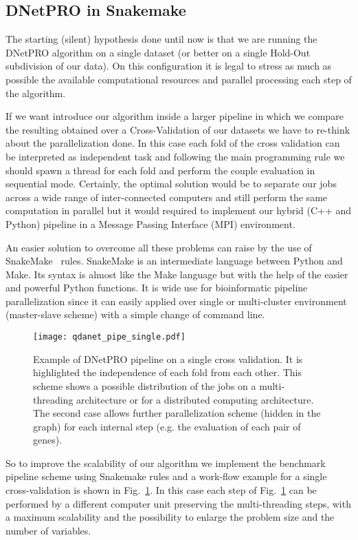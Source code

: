 \documentclass{standalone}
\begin{document}
\subsection[Pipeline]{DNetPRO in Snakemake}\label{implementation:snakemake}

The starting (silent) hypothesis done until now is that we are running the DNetPRO algorithm on a single dataset (or better on a single Hold-Out subdivision of our data).
On this configuration it is legal to stress as much as possible the available computational resources and parallel processing each step of the algorithm.

If we want introduce our algorithm inside a larger pipeline in which we compare the resulting obtained over a Cross-Validation of our datasets we have to re-think about the parallelization done.
In this case each fold of the cross validation can be interpreted as independent task and following the main programming rule \emph{} we should spawn a thread for each fold and perform the couple evaluation in sequential mode.
Certainly, the optimal solution would be to separate our jobs across a wide range of inter-connected computers and still perform the same computation in parallel but it would required to implement our hybrid (C++ and Python) pipeline in a Message Passing Interface (MPI) environment.

An easier solution to overcome all these problems can raise by the use of SnakeMake~\cite{snakemake} rules.
SnakeMake is an intermediate language between Python and Make.
Its syntax is almost like the Make language but with the help of the easier and powerful Python functions.
It is wide use for bioinformatic pipeline parallelization since it can easily applied over single or multi-cluster environment (master-slave scheme) with a simple change of command line.

\begin{center}
\begin{figure}[htbp]
\hspace{-2cm}
\texttt{[image: qdanet\_pipe\_single.pdf]}
\caption{Example of DNetPRO pipeline on a single cross validation.
It is highlighted the independence of each fold from each other.
This scheme shows a possible distribution of the jobs on a multi-threading architecture or for a distributed computing architecture.
The second case allows further parallelization scheme (hidden in the graph) for each internal step (e.g. the evaluation of each pair of genes).
}
\label{fig:dnet_workflow}
\end{figure}
\end{center}

So to improve the scalability of our algorithm we implement the benchmark pipeline scheme using Snakemake rules and a work-flow example for a single cross-validation is shown in Fig.~\ref{fig:dnet_workflow}.
In this case each step of Fig.~\ref{fig:dnet_workflow} can be performed by a different computer unit preserving the multi-threading steps, with a maximum scalability and the possibility to enlarge the problem size and the number of variables.
\end{document}
